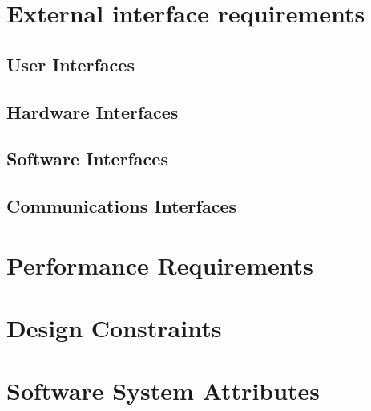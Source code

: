 \documentclass{scrreprt}
\begin{document}
\section{External interface requirements}


\subsection{User Interfaces}

\subsection{Hardware Interfaces}


\subsection{Software Interfaces}


\subsection{Communications Interfaces}




\section{Performance Requirements}

\section{Design Constraints}


\section{Software System Attributes}


%

\newpage
\printindex
\end{document}
